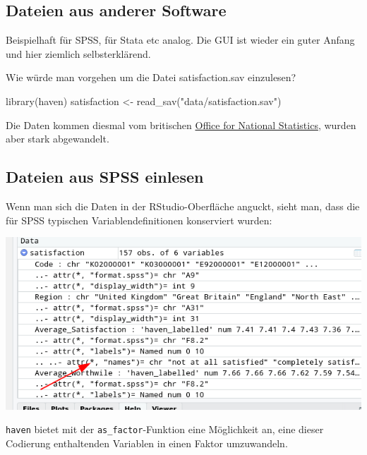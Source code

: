 \documentclass[
]{book}
\newenvironment{Shaded}{\begin{snugshade}}{\end{snugshade}}
\newcommand{\FunctionTok}[1]{\textcolor[rgb]{0.00,0.00,0.00}{#1}}
\newcommand{\NormalTok}[1]{#1}
\newcommand{\OtherTok}[1]{\textcolor[rgb]{0.56,0.35,0.01}{#1}}
\newcommand{\StringTok}[1]{\textcolor[rgb]{0.31,0.60,0.02}{#1}}
\begin{document}
\hypertarget{dateien-aus-anderer-software}{%
\subsection{Dateien aus anderer Software}\label{dateien-aus-anderer-software}}

Beispielhaft für SPSS, für Stata etc analog.
Die GUI ist wieder ein guter Anfang und hier ziemlich selbsterklärend.

Wie würde man vorgehen um die Datei satisfaction.sav einzulesen?

\begin{Shaded}
\begin{Highlighting}[]
\FunctionTok{library}\NormalTok{(haven)}
\NormalTok{satisfaction }\OtherTok{\textless{}{-}} \FunctionTok{read\_sav}\NormalTok{(}\StringTok{"data/satisfaction.sav"}\NormalTok{)}
\end{Highlighting}
\end{Shaded}

Die Daten kommen diesmal vom britischen \href{https://www.ons.gov.uk/peoplepopulationandcommunity/wellbeing/adhocs/007955estimatesofpersonalwellbeingbrokendownbycountryofbirthfromtheukannualpopulationsurveyaps}{Office for National Statistics}, wurden aber stark abgewandelt.

\hypertarget{dateien-aus-spss-einlesen}{%
\subsection{Dateien aus SPSS einlesen}\label{dateien-aus-spss-einlesen}}

Wenn man sich die Daten in der RStudio-Oberfläche anguckt, sieht man, dass die für SPSS typischen Variablendefinitionen konserviert wurden:

\begin{center}\includegraphics[width=0.8\linewidth]{imgs/spss1} \end{center}

\texttt{haven} bietet mit der \texttt{as\_factor}-Funktion eine Möglichkeit an, eine dieser Codierung enthaltenden Variablen in einen Faktor umzuwandeln.
\end{document}
